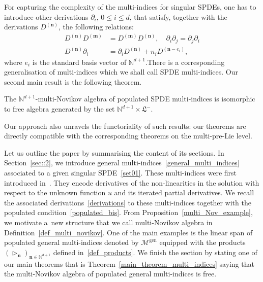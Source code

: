 \documentclass[AHL,Unicode,longabstracts]{cedram}
\newcommand{\bn}{\mathbf{n}}
\newcommand{\bm}{\mathbf{m}}
\newcommand{\mcM}{\mathcal{M}}
\newcommand{\mfL}{\mathfrak{L}}
\newcommand{\bbN}{\mathbb{N}}
\newcommand{\genn}{\mathrm{gen}}
\begin{document}
For capturing the complexity of the multi-indices for singular SPDEs, one has to introduce other derivations $\partial_i$, $0\le i\le d$, that satisfy, together with the derivations $ D^{(\bn)} $, the following relations:
\begin{equation*}
\begin{aligned}
D^{(\bn)}D^{(\bm)} & = D^{(\bm)}D^{(\bn)}, \quad \partial_i \partial_j = \partial_j \partial_i
\\ D^{(\bn)} \partial_i & = \partial_i D^{(\bn)} + n_iD^{(\bn-e_i)},
\end{aligned}
\end{equation*}
where $e_i$ is the standard basis vector of $\bbN^{d+1}$.There is a corresponding generalisation of multi-indices which we shall call SPDE multi-indices. Our second main result is the following theorem.

\begin{theo} \label{free_Novikov_general_monomial}
The $\bbN^{d+1}$-multi-Novikov algebra of populated SPDE multi-indices is isomorphic to free algebra generated by the set $\bbN^{d+1}\times \mfL^-$.
\end{theo}

Our approach also unravels the functoriality of such results: our theorems are directly compatible with the corresponding theorems on the multi-pre-Lie level.

Let us outline the paper by summarising the content of its sections. In Section~\ref{sec::2}, we introduce general multi-indices~\eqref{general_multi_indices} associated to a given singular SPDE~\eqref{set01}. These multi-indices were first introduced in~\cite{BL23}. They encode derivatives of the non-linearities in the solution with respect to the unknown function $u$ and its iterated partial derivatives. We recall the associated derivations~\eqref{derivations} to these multi-indices together with the populated condition~\eqref{populated_bis}. From Proposition~\ref{multi_Nov_example}, we motivate a~new structure that we call multi-Novikov algebra in Definition~\ref{def_multi_novikov}. One of the main examples is the linear span of populated general multi-indices denoted by $\mcM^{\genn}$ equipped with the products $ (\triangleright_{\bn})_{\bn \in \bbN^{d+1}} $ defined in~\eqref{def_products}. We finish the section by stating one of our main theorems that is Theorem~\ref{main_theorem_multi_indices} saying that the multi-Novikov algebra of populated general multi-indices is free.
\end{document}
